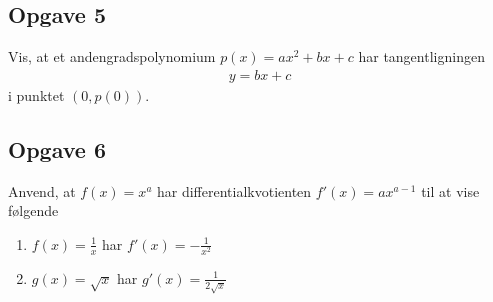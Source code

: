 \subsection*{Opgave 5}
Vis, at et andengradspolynomium $p(x) = ax^2+bx+c$ har tangentligningen
\begin{align*}
	y = bx +c
\end{align*}
i punktet $(0,p(0))$.
	
\subsection*{Opgave 6}
Anvend, at $f(x) = x^a$ har differentialkvotienten $f'(x) = ax^{a-1}$ til at vise følgende
\begin{enumerate}[label=\roman*)]
	\item $f(x) = \frac{1}{x}$ har $f'(x) = -\frac{1}{x^2}$
	\item $g(x) = \sqrt{x}$ har $g'(x) = \frac{1}{2\sqrt{x}}$
\end{enumerate}